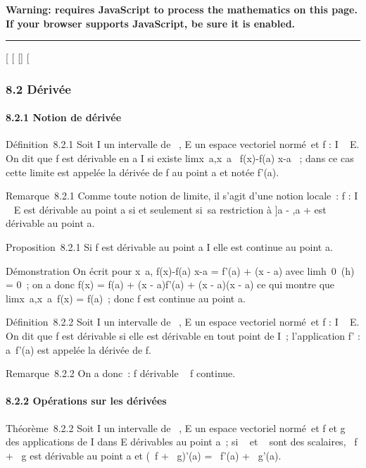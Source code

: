 \textbf{Warning: 
requires JavaScript to process the mathematics on this page.\\ If your
browser supports JavaScript, be sure it is enabled.}

\begin{center}\rule{3in}{0.4pt}\end{center}

{[}
{[}
{[}{]}
{[}

\subsubsection{8.2 Dérivée}

\paragraph{8.2.1 Notion de dérivée}

Définition~8.2.1 Soit I un intervalle de ~, E un espace vectoriel
normé~et f : I \rightarrow~ E. On dit que f est dérivable en a \in I si existe
limx\rightarrow~a,x\neq~a~
f(x)-f(a) \over x-a ~; dans ce cas cette limite est
appelée la dérivée de f au point a et notée f'(a).

Remarque~8.2.1 Comme toute notion de limite, il s'agit d'une notion
locale~: f : I \rightarrow~ E est dérivable au point a si et seulement si~sa
restriction à {]}a - \eta,a + \eta{[}\bigcapI est dérivable au point a.

Proposition~8.2.1 Si f est dérivable au point a \in I elle est continue au
point a.

Démonstration On écrit pour x\neq~a,  f(x)-f(a)
\over x-a = f'(a) + \epsilon(x - a) avec
limh\rightarrow~0~\epsilon(h) = 0~; on a donc f(x) =
f(a) + (x - a)f'(a) + (x - a)\epsilon(x - a) ce qui montre que
limx\rightarrow~a,x\neq~a~f(x)
= f(a)~; donc f est continue au point a.

Définition~8.2.2 Soit I un intervalle de ~, E un espace vectoriel
normé~et f : I \rightarrow~ E. On dit que f est dérivable si elle est dérivable en
tout point de I~; l'application f' : a\mapsto~f'(a)
est appelée la dérivée de f.

Remarque~8.2.2 On a donc~: f dérivable \rigtharrow~ f continue.

\paragraph{8.2.2 Opérations sur les dérivées}

Théorème~8.2.2 Soit I un intervalle de ~, E un espace vectoriel normé~et
f et g des applications de I dans E dérivables au point a~; si \alpha~ et \beta~
sont des scalaires, \alpha~f + \beta~g est dérivable au point a et (\alpha~f + \beta~g)'(a) =
\alpha~f'(a) + \beta~g'(a).

